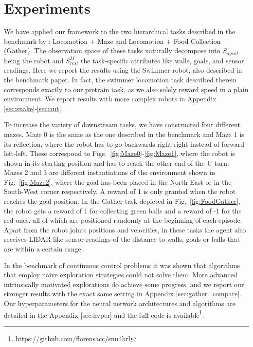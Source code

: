 \documentclass{article} %
\begin{document}
\section{Experiments}
\label{sec:experiments}
We have applied our framework to the two hierarchical tasks described in the benchmark by \cite{duan2016benchmarking}: Locomotion + Maze and Locomotion + Food Collection (Gather). The observation space of these tasks naturally decompose into $S_{agent}$ being the robot and $S_{rest}^M$ the task-specific attributes like walls, goals, and sensor readings. Here we report the results using the Swimmer robot, also described in the benchmark paper. In fact, the swimmer locomotion task described therein corresponds exactly to our pretrain task, as we also solely reward speed in a plain environment. We report results with more complex robots in Appendix \ref{sec:snake}-\ref{sec:ant}.

To increase the variety of downstream tasks, we have constructed four different mazes. Maze 0 is the same as the one described in the benchmark \citep{duan2016benchmarking} and Maze 1 is its reflection, where the robot has to go backwards-right-right instead of forward-left-left. These correspond to  Figs.\ \ref{fig:Maze0}-\ref{fig:Maze1}, where the robot is shown in its starting position and has to reach the other end of the U turn. Mazes 2 and 3 are different instantiations of the environment shown in Fig.\ \ref{fig:Maze2}, where the goal has been placed in the North-East or in the South-West corner respectively. A reward of 1 is only granted when the robot reaches the goal position. In the Gather task depicted in Fig.\ \ref{fig:FoodGather}, the robot gets a reward of 1 for collecting green balls and a reward of -1 for the red ones, all of which are positioned randomly at the beginning of each episode. Apart from the robot joints positions and velocities, in these tasks the agent also receives LIDAR-like sensor readings of the distance to walls, goals or balls that are within a certain range. 

In the benchmark of continuous control problems \citep{duan2016benchmarking} it was shown that algorithms that employ naive exploration strategies could not solve them. More advanced intrinsically motivated explorations \citep{houthooft2016variational} do achieve some progress, and we report our stronger results with the exact same setting in Appendix \ref{sec:gather_compare}. Our hyperparameters for the neural network architectures and algorithms are detailed in the Appendix \ref{sec:hyper} and the full code is available\footnote{https://github.com/florensacc/snn4hrl}.
\end{document}
